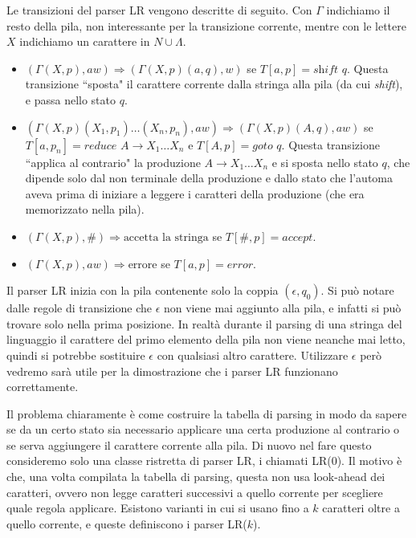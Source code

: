 \documentclass[12pt]{article}
\numberwithin{theorem}{subsection}
\begin{document}
Le transizioni del parser LR vengono descritte di seguito. Con $\Gamma$ indichiamo il resto della pila, non interessante per la transizione corrente, mentre con le lettere $X$ indichiamo un carattere in $N \cup \Lambda$.
\begin{itemize}
	\item $(\Gamma (X, p), a w) \Rightarrow ( \Gamma (X, p) (a, q), w)$ se $T[a, p] = \textit{shift }q$. Questa transizione ``sposta" il carattere corrente dalla stringa alla pila (da cui \textit{shift}), e passa nello stato $q$.
	\item $(\Gamma (X, p) (X_1, p_1) \dots (X_n, p_n), a w) \Rightarrow ( \Gamma (X, p) (A, q), a w)$ se $T[a, p_n] = \textit{reduce }A \rightarrow X_1 \dots X_n$ e $T[A, p] = \textit{goto }q$. Questa transizione ``applica al contrario" la produzione $A \rightarrow X_1 \dots X_n$ e si sposta nello stato $q$, che dipende solo dal non terminale della produzione e dallo stato che l'automa aveva prima di iniziare a leggere i caratteri della produzione (che era memorizzato nella pila).
	\item $(\Gamma (X, p), \#) \Rightarrow \text{accetta la stringa}$ se $T[\#, p] = \textit{accept}$.
	\item $(\Gamma (X, p), a w) \Rightarrow \text{errore}$ se $T[a, p] = \textit{error}$.
\end{itemize}

Il parser LR inizia con la pila contenente solo la coppia $(\epsilon, q_0)$. Si può notare dalle regole di transizione che $\epsilon$ non viene mai aggiunto alla pila, e infatti si può trovare solo nella prima posizione. In realtà durante il parsing di una stringa del linguaggio il carattere del primo elemento della pila non viene neanche mai letto, quindi si potrebbe sostituire $\epsilon$ con qualsiasi altro carattere. Utilizzare $\epsilon$ però vedremo sarà utile per la dimostrazione che i parser LR funzionano correttamente.

Il problema chiaramente è come costruire la tabella di parsing in modo da sapere se da un certo stato sia necessario applicare una certa produzione al contrario o se serva aggiungere il carattere corrente alla pila. Di nuovo nel fare questo consideremo solo una classe ristretta di parser LR, i chiamati LR(0). Il motivo è che, una volta compilata la tabella di parsing, questa non usa look-ahead dei caratteri, ovvero non legge caratteri successivi a quello corrente per scegliere quale regola applicare. Esistono varianti in cui si usano fino a $k$ caratteri oltre a quello corrente, e queste definiscono i parser LR($k$).
\end{document}
